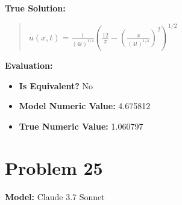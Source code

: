 \documentclass{article}
\begin{document}
\textbf{True Solution:}
\begin{quote}
$u(x,t) = \frac{1}{(4t)^{1/4}} ( \frac{12}{\pi} - (\frac{x}{(4t)^{1/4}})^2 )^{1/2}$
\end{quote}

\textbf{Evaluation:}
\begin{itemize}
\item \textbf{Is Equivalent?} No
\item \textbf{Model Numeric Value:} 4.675812
\item \textbf{True Numeric Value:} 1.060797
\end{itemize}
\vspace{1cm}
\section*{Problem 25}
\textbf{Model:} Claude 3.7 Sonnet
\end{document}
